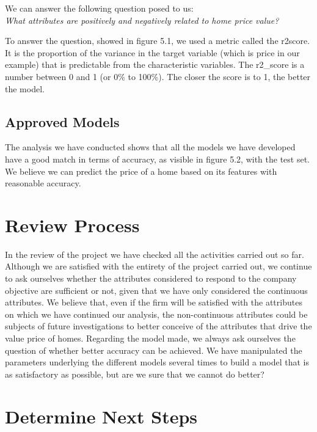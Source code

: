 We can answer the following question posed to us:
\\
\emph{What attributes are positively and negatively related to home price value?}

To answer the question, showed in figure 5.1, we used a metric called the r2\-score. It is the proportion of the variance in the target variable (which is price in our example) that is predictable from the characteristic variables. The r2\_score is a number between 0 and 1 (or 0\% to 100\%). The closer the score is to 1, the better the model.

\subsection{Approved Models}

The analysis we have conducted shows that all the models we have developed have a good match in terms of accuracy, as visible in figure 5.2, with the test set. We believe we can predict the price of a home based on its features with reasonable accuracy.

\section{Review Process}

In the review of the project we have checked all the activities carried out so far. Although we are satisfied with the entirety of the project carried out, we continue to ask ourselves whether the attributes considered to respond to the company objective are sufficient or not, given that we have only considered the continuous attributes. We believe that, even if the firm will be satisfied with the attributes on which we have continued our analysis, the non-continuous attributes could be subjects of future investigations to better conceive of the attributes that drive the value price of homes. Regarding the model made, we always ask ourselves the question of whether better accuracy can be achieved. We have manipulated the parameters underlying the different models several times to build a model that is as satisfactory as possible, but are we sure that we cannot do better?

\section{Determine Next Steps}

